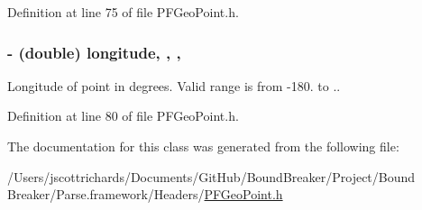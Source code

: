 Definition at line 75 of file P\+F\+Geo\+Point.\+h.

\hypertarget{interface_p_f_geo_point_ae18b7781d731f421f3feeafd9c99be8b}{}
\subsubsection[{longitude}]{\setlength{\rightskip}{0pt plus 5cm}-\/ (double) longitude\hspace{0.3cm}{\ttfamily [read]}, {\ttfamily [write]}, {\ttfamily [nonatomic]}, {\ttfamily [assign]}}\label{interface_p_f_geo_point_ae18b7781d731f421f3feeafd9c99be8b}
Longitude of point in degrees. Valid range is from {\ttfamily -\/180.} to {.}. 

Definition at line 80 of file P\+F\+Geo\+Point.\+h.



The documentation for this class was generated from the following file\+:\begin{DoxyCompactItemize}
\item 
/\+Users/jscottrichards/\+Documents/\+Git\+Hub/\+Bound\+Breaker/\+Project/\+Bound Breaker/\+Parse.\+framework/\+Headers/\hyperlink{_p_f_geo_point_8h}{P\+F\+Geo\+Point.\+h}\end{DoxyCompactItemize}
